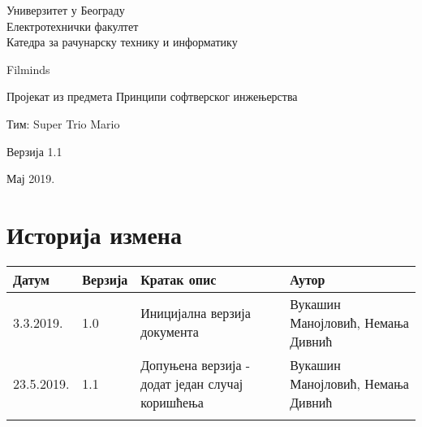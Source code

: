\documentclass[12pt,a4paper]{article}
\begin{document}
\begin{titlepage}
\begin{center}
    Универзитет у Београду \\
    Електротехнички факултет \\
    Катедра за рачунарску технику и информатику \\
    \vfill

    {\fontsize{50}{60}\selectfont Filminds}
    \vskip 0.6cm

    {\large Пројекат из предмета Принципи софтверског инжењерства }
    \vskip 0.3cm

    {\large Тим: Super Trio Mario}
    \vskip 0.3cm

    {\large Верзија 1.1}

    \vfill
    \vfill

    Мај 2019.
    \hfill
\end{center}
\end{titlepage}

\section*{Историја измена}
\noindent
\setcellgapes{4pt}
\makegapedcells
\begin{tabularx}{\linewidth}{|l|l|X|X|}
    \hline
    \textbf{Датум} & \textbf{Верзија} & \textbf{Кратак опис} & \textbf{Аутор} \\
    \hline
    3.3.2019. & 1.0 & Иницијална верзија документа & Вукашин Манојловић, \newline Немања Дивнић \\
    \hline
    23.5.2019. & 1.1 & Допуњена верзија - додат један случај коришћења & Вукашин Манојловић, \newline Немања Дивнић \\
    \hline
    & & & \\
    \hline
\end{tabularx}
\newpage

\tableofcontents
\newpage











\end{document}
